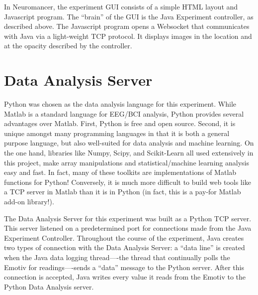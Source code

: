 \documentclass[12pt]{report}
\begin{document}
	In Neuromancer, the experiment GUI consists of a simple HTML layout and Javascript program.  The “brain” of the GUI is the Java Experiment controller, as described above.  The Javascript program opens a Websocket\cite{websocket} that communicates with Java via a light-weight TCP protocol.  It displays images in the location and at the opacity described by the controller.

\section{Data Analysis Server}
	Python was chosen as the data analysis language for this experiment.  While Matlab is a standard language for EEG/BCI analysis, Python provides several advantages over Matlab.  First, Python is free and open source.  Second, it is unique amongst many programming languages in that it is both a general purpose language, but also well-suited for data analysis and machine learning.  On the one hand, libraries like Numpy, Scipy\cite{scipy}, and Scikit-Learn\cite{sklearn} all used extensively in this project, make array manipulations and statistical/machine learning analysis easy and fast.  In fact, many of these toolkits are implementations of Matlab functions for Python!  Conversely, it is much more difficult to build web tools like a TCP server in Matlab than it is in Python (in fact, this is a pay-for Matlab add-on library!). 

	The Data Analysis Server for this experiment was built as a Python TCP server.  This server listened on a predetermined port for connections made from the Java Experiment Controller.  Throughout the course of the experiment, Java creates two types of connection with the Data Analysis Server: a ``data line'' is created when the Java data logging thread—-the thread that continually polls the Emotiv for readings—-sends a ``data'' message to the Python server.  After this connection is accepted, Java writes every value it reads from the Emotiv to the Python Data Analysis server.  
\end{document}
